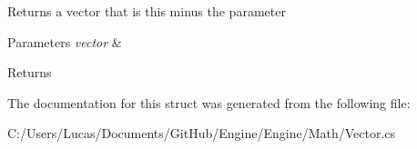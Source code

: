Returns a vector that is this minus the parameter 


\begin{DoxyParams}{Parameters}
{\em vector} & \\
\hline
\end{DoxyParams}
\begin{DoxyReturn}{Returns}

\end{DoxyReturn}


The documentation for this struct was generated from the following file\-:\begin{DoxyCompactItemize}
\item 
C\-:/\-Users/\-Lucas/\-Documents/\-Git\-Hub/\-Engine/\-Engine/\-Math/Vector.\-cs\end{DoxyCompactItemize}
